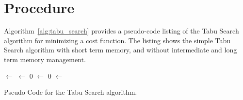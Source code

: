 \documentclass[a4paper, 11pt]{article}
\begin{document}
\section{Procedure}
\label{sec:procedure}
Algorithm~\ref{alg:tabu_search} provides a pseudo-code listing of the Tabu Search algorithm for minimizing a cost function. The listing shows the simple Tabu Search algorithm with short term memory, and without intermediate and long term memory management. 

\begin{algorithm}[ht]
	\SetLine
	\KwIn{\TabuListSize}
	\KwOut{\Best}
	\Best $\leftarrow$ \ConstructInitialSolution{}\;
	\TabuList $\leftarrow$ 0\;
	\While{$\neg$ \StopCondition{}} {
		\CandidateList $\leftarrow$ 0\;
		\For{\Candidate $\in$ \CandidateNeighborhood}{
			\If{$\neg$ \ContainsAnyFeatures{\Candidate, \TabuList}}{
				\CandidateList $\leftarrow$ \Candidate\;
			}
		}
		\Candidate $\leftarrow$ \LocateBestCandidate{\CandidateList}\;
		\If{\Cost{\Candidate} $\leq$ \Cost{\Best}}{
			\Best $\leftarrow$ \Candidate\;
			\TabuList $\leftarrow$ \FeatureDifferences{\Candidate, \Best}\;
			\While{\TabuList $>$ \TabuListSize} {
				\DeleteFeature{\TabuList}\;
			}
		}
	}
	\Return{\Best}\;
	\caption{Pseudo Code for the Tabu Search algorithm.}
	\label{alg:tabu_search}
\end{algorithm}
\end{document}
